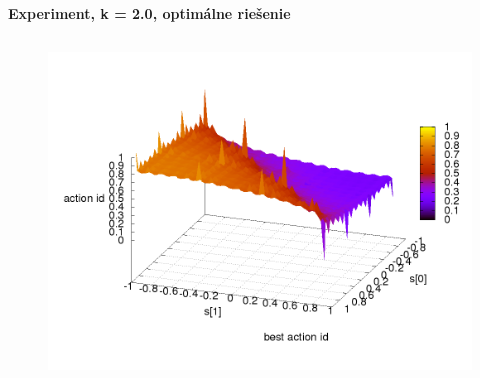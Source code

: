 \documentclass[xcolor=dvipsnames]{beamer}
\begin{document}
\begin{frame}{\bf Experiment, k = 2.0, optimálne riešenie}
\begin{columns}
\begin{column}{0.5\textwidth}
\begin{figure}[ht]
        \begin{center}
        \includegraphics[width=1.0\textwidth]{experiment_02/table/q_action_id.png}
        \end{center}

        \end{figure}

	\end{column}
\end{columns}

\end{frame}
\end{document}
